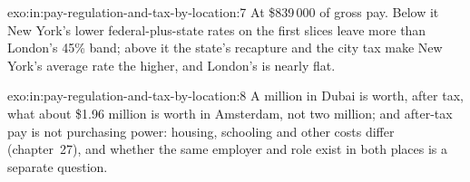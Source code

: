 \begin{solution}{exo:in:pay-regulation-and-tax-by-location:7}
At \$839\,000 of gross pay. Below it New York's lower federal-plus-state rates on the first slices leave more than London's
45\% band; above it the state's recapture and the city tax make New York's average rate the higher, and London's is nearly
flat.
\end{solution}

\begin{solution}{exo:in:pay-regulation-and-tax-by-location:8}
A million in Dubai is worth, after tax, what about \$1.96 million is worth in Amsterdam, not two million; and after-tax
pay is not purchasing power: housing, schooling and other costs differ (chapter~27), and whether the same employer and
role exist in both places is a separate question.
\end{solution}

